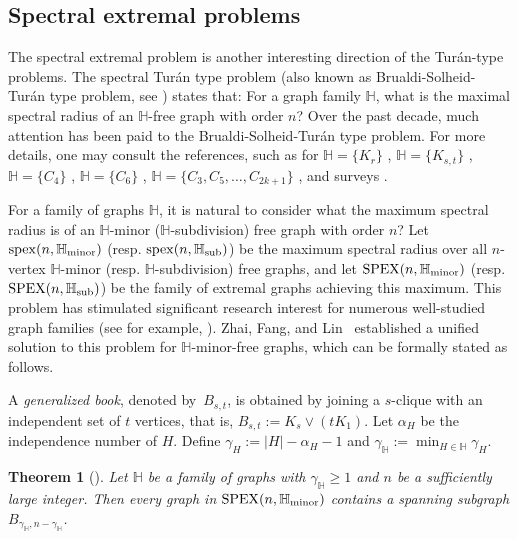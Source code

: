 \documentclass[11pt, a4paper]{article}
\newtheorem{theorem}{Theorem}[section]
\theoremstyle{definition}
\newcommand{\<}{\subseteq}
\begin{document}
\subsection{Spectral extremal problems}
The spectral extremal problem is another interesting direction of the Tur{\'a}n-type problems. The spectral Tur\'{a}n type problem (also known as Brualdi-Solheid-Tur\'{a}n type problem, see \cite{Nik2}) states that: For a graph family $\mathbb{H}$, what is the maximal spectral radius of an $\mathbb{H}$-free graph with order $n$? Over the past decade, much attention has been paid to the Brualdi-Solheid-Tur\'{a}n type problem. For more details, one may consult the references, such as for $\mathbb{H}= \{K_r\}$ \cite{Nik3,Wilf}, $\mathbb{H}= \{K_{s,t}\}$ \cite{Bab,Nik3,Nik4}, $\mathbb{H}= \{C_4\}$ \cite{Nik6,ZW},  $\mathbb{H}= \{C_6\}$ \cite{zhai1}, $\mathbb{H}= \{C_3,C_5,\ldots,C_{2k+1}\}$ \cite{Sun2022}, and surveys \cite{surveyli,Liuning}.

For a family of graphs $\mathbb{H}$, it is natural to consider what the maximum spectral radius is of an $\mathbb{H}$-minor ($\mathbb{H}$-subdivision) free graph with  order $n$?  Let ${\rm spex}(n,\mathbb{H}_{\rm minor})$ (resp. ${\rm spex}(n,\mathbb{H}_{\rm sub})$) be the maximum spectral radius over all $n$-vertex $\mathbb{H}$-minor (resp. $\mathbb{H}$-subdivision) free graphs, and let ${\rm SPEX}(n,\mathbb{H}_{\rm minor})$ (resp. ${\rm SPEX}(n,\mathbb{H}_{\rm sub})$) be the family of extremal graphs achieving this maximum.  
This problem has stimulated significant research interest for numerous well-studied graph families %
(see for example, \cite{Hong,Nikiforov-minor,Tait2019,Tait2017,Zhai-minor}). Zhai, Fang, and Lin~\cite{zhai} established a unified solution to this problem for $\mathbb{H}$-minor-free graphs, which can be formally stated as follows. %

A \textit{generalized book}, denoted by~$B_{s,t}$, is obtained by joining a $s$-clique with an independent set of $t$ vertices, that is, $B_{s,t}:=K_s\vee (tK_1)$. Let  $\alpha_H$ be the independence number of $H$. Define $\gamma_H:=|H|-\alpha_H-1$ and $\gamma_\mathbb{H}:=\min_{H\in\mathbb{H}}\gamma_H$.
\begin{theorem}[\cite{zhai}]\label{thm1.2}
    Let $\mathbb{H}$ be a family of graphs with $\gamma_{\mathbb{H}}\geq 1$ and $n$ be a sufficiently large integer. Then  every graph in ${\rm SPEX}(n,\mathbb{H}_{\rm minor})$ contains a spanning subgraph $B_{\gamma_\mathbb{H},n-\gamma_\mathbb{H}}$.
\end{theorem}
\end{document}
